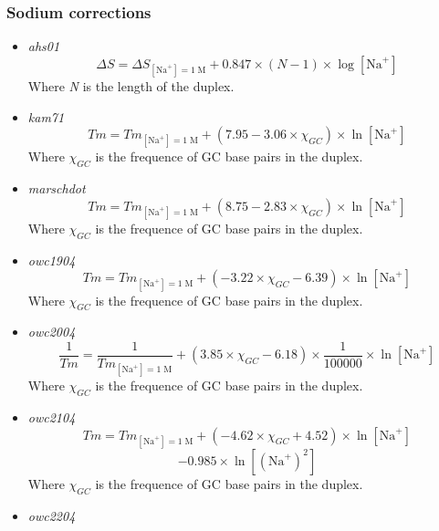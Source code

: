 \documentclass{article}
\begin{document}
\subsubsection{Sodium corrections}
 \begin{itemize}
 \item \textit{ahs01}
 \begin{displaymath}
  \Delta{}S=\Delta{}S_{[\mbox{Na}^+]=1\;\mathrm{M}}+0.847 \times (N - 1) \times \log [\mbox{Na}^+]   
 \end{displaymath}
 Where \emph{N} is the length of the duplex.
 \item \textit{kam71}
 \begin{displaymath}
  Tm=Tm_{[\mbox{Na}^+]=1\;\mathrm{M}}+(7.95 - 3.06 \times \chi_{GC}) \times \ln [\mbox{Na}^+]  
 \end{displaymath}
 Where \emph{$\chi_{GC}$} is the frequence of GC base pairs in the duplex.
 \item \textit{marschdot}
 \begin{displaymath}
  Tm=Tm_{[\mbox{Na}^+]=1\;\mathrm{M}}+ (8.75 - 2.83 \times \chi_{GC}) \times \ln [\mbox{Na}^+]  
 \end{displaymath}
 Where \emph{$\chi_{GC}$} is the frequence of GC base pairs in the duplex.
 \item \textit{owc1904}
 \begin{displaymath}
  Tm=Tm_{[\mbox{Na}^+]=1\;\mathrm{M}}+ (-3.22 \times \chi_{GC} - 6.39) \times \ln [\mbox{Na}^+]  
 \end{displaymath}
 Where \emph{$\chi_{GC}$} is the frequence of GC base pairs in the duplex.
 \item \textit{owc2004}
 \begin{displaymath}
 \frac{1}{Tm}=\frac{1}{Tm_{[\mbox{Na}^+]=1\;\mathrm{M}}}+ (3.85 \times \chi_{GC} - 6.18) \times \frac{1}{100000} \times \ln [\mbox{Na}^+]  
 \end{displaymath}
 Where \emph{$\chi_{GC}$} is the frequence of GC base pairs in the duplex.
 \item \textit{owc2104}
 \begin{displaymath}
 Tm=Tm_{[\mbox{Na}^+]=1\;\mathrm{M}}+ (-4.62 \times \chi_{GC} + 4.52) \times \ln [\mbox{Na}^+] 
 \end{displaymath}
 \begin{displaymath}
 - 0.985 \times \ln [(\mbox{Na}^+)^2]  
 \end{displaymath}
 Where \emph{$\chi_{GC}$} is the frequence of GC base pairs in the duplex.
 \item \textit{owc2204}

\end{itemize}
\end{document}
